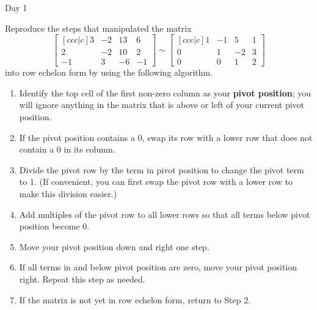 \begin{applicationActivities}{Day 1}
\begin{activity}
  Reproduce the steps that manipulated the matrix
  \[
    \begin{bmatrix}[ccc|c]
      3 & -2 & 13 & 6 \\
      2 & -2 & 10 & 2 \\
      -1 & 3 & -6 & -1
    \end{bmatrix}\sim
    \begin{bmatrix}[ccc|c]
      1 & -1 &  5 & 1 \\
      0 &  1 & -2 & 3 \\
      0 &  0 &  1 & 2
    \end{bmatrix}
  \]
  into row echelon form by using the following algorithm.
  \begin{multicols}{2}\noindent
  \begin{enumerate}
    \item Identify
    the top cell of the first non-zero column as your \textbf{pivot position};
    you will ignore anything in the matrix that is above or left of your
    current pivot position.
    \item If the pivot position contains a \(0\), swap its row with a lower
          row that does not contain a \(0\) in its column.
    \item Divide the pivot row by the term in pivot position to change the
          pivot term to \(1\). (If convenient, you can first swap the
          pivot row with a lower row to make this division easier.)
    \item Add multiples of the pivot row to all lower rows so that all terms
          below pivot position become \(0\).
    \item Move your pivot position down and right one step.
    \item If all terms in and below pivot position are zero, move your
          pivot position right. Repeat this step as needed.
    \item If the matrix is not yet in row echelon form, return to Step 2.
  \end{enumerate}
  \end{multicols}
\end{activity}



\end{applicationActivities}
